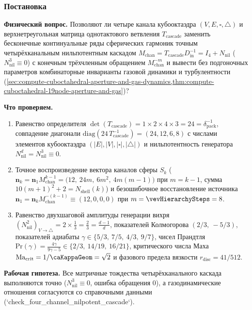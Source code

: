 \label{exp:cecp02}

\subsubsection*{Постановка}
\textbf{Физический вопрос.}
Позволяют ли четыре канала кубооктаэдра $(V,E,\square,\triangle)$ и верхнетреугольная матрица однотактового ветвления $T_{\mathrm{cascade}}$ заменить бесконечные континуальные ряды сферических гармоник точным четырёхканальным нильпотентным каскадом $M_{\mathrm{chan}} = T_{\mathrm{cascade}} D_{\mathrm{in}}^{-1} = I_4 + N_{\mathrm{nil}}$ ($N_{\mathrm{nil}}^3 \equiv 0$) с конечным трёхчленным обращением $M_{\mathrm{chan}}^{-m}$ и вывести без подгоночных параметров комбинаторные инварианты газовой динамики и турбулентности (\cref{sec:compute-cuboctahedral-aperture-and-gas-dynamics,thm:compute-cuboctahedral-19node-aperture-and-gas})?

\textbf{Что проверяем.}
\begin{enumerate}[label=\textbf{(\alph*)},leftmargin=*,itemsep=0.25em]
\item Равенство определителя $\det(T_{\mathrm{cascade}}) = 1\times 2\times 4\times 3 = 24 = \delta_{\mathrm{pack}}^{-1}$, совпадение диагонали $\mathrm{diag}(24\,T_{\mathrm{cascade}}^{-1}) = (24,12,6,8)$ с числами элементов кубооктаэдра $(|E|,|V|,|\square|,|\triangle|)$ и нильпотентность генератора $N_{\mathrm{nil}}^d = N_{\mathrm{nil}}^3 \equiv 0$.
\item Точное воспроизведение вектора каналов сферы $S_k$ ($\mathbf{n}_k = \mathbf{n}_1 M_{\mathrm{chan}}^{k-1} = \bigl(12,\ 24m,\ 6m^2,\ 4m(m-1)\bigr)$ при $m = k - 1$, сумма $10(m+1)^2+2 = N_{\mathrm{shell}}(k)$) и безошибочное восстановление источника $\mathbf{n}_1 = \mathbf{n}_k M_{\mathrm{chan}}^{-(k-1)} \equiv (12,0,0,0)$ при $m = \vevHierarchySteps = 8$.
\item Равенство двухшаговой амплитуды генерации вихря $(N_{\mathrm{nil}}^2)_{V\to\triangle} = 2\times\frac{1}{3} = \frac{2}{3} = \frac{d-1}{d}$, показателей Колмогорова $(2/3,\ -5/3)$, показателей адиабаты $\gamma \in \{5/3,\ 7/5,\ 4/3,\ 9/7\}$, чисел Прандтля $\mathrm{Pr}(\gamma) = \frac{4\gamma}{9\gamma-5} \in \{2/3,\ 14/19,\ 16/21\}$, критического числа Маха $\mathrm{Ma}_{\mathrm{crit}} = 1/\caKappaGeom = \sqrt{2}$ и фазового предела вязкости $r_{\mathrm{disc}} = 41/512$.
\end{enumerate}

\textbf{Рабочая гипотеза.}
Все матричные тождества четырёхканального каскада выполняются точно ($N_{\mathrm{nil}}^3 \equiv 0$, ошибка обращения $0$), а газодинамические отношения согласуются со справочными данными (`check\_four\_channel\_nilpotent\_cascade`).

